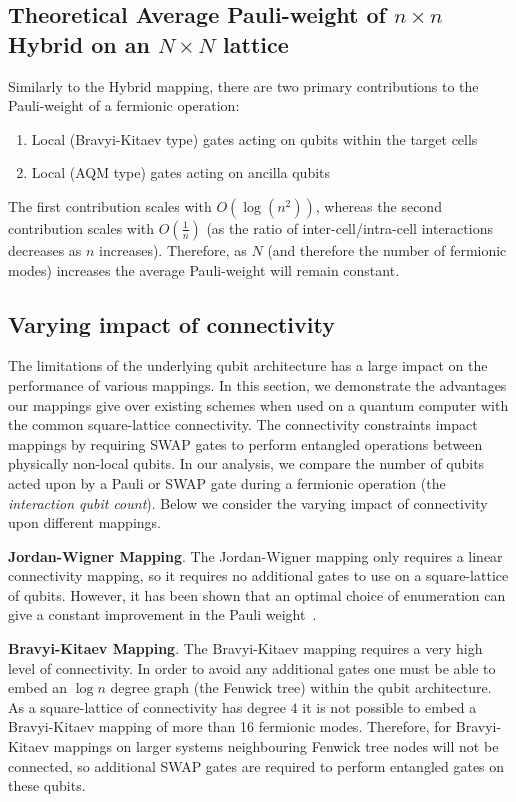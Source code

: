 \documentclass[pdftex,pra,aps,twocolumn,twoside]{revtex4-1}
\theoremstyle{plain}
\theoremstyle{note}
\newcommand\+{{\footnotesize \raisebox{0.3ex}{+}}}
\begin{document}
\subsection{Theoretical Average Pauli-weight of $n\times n$ Hybrid\+ on an $N\times N$ lattice}
Similarly to the Hybrid mapping, there are two primary contributions to the Pauli-weight of a fermionic operation:
\begin{enumerate}
    \item Local (Bravyi-Kitaev type) gates acting on qubits within the target cells
    \item Local (AQM type) gates acting on ancilla qubits
\end{enumerate}
The first contribution scales with $O(\log(n^2))$, whereas the second contribution scales with $O(\frac{1}{n})$ (as the ratio of inter-cell/intra-cell interactions decreases as $n$ increases). Therefore, as $N$ (and therefore the number of fermionic modes) increases the average Pauli-weight will remain constant.

\subsection{Varying impact of connectivity}
\label{section:connectivity}
The limitations of the underlying qubit architecture has a large impact on the performance of various mappings. In this section, we demonstrate the advantages our mappings give over existing schemes when used on a quantum computer with the common square-lattice connectivity. The connectivity constraints impact mappings by requiring SWAP gates to perform entangled operations between physically non-local qubits. In our analysis, we compare the number of qubits acted upon by a Pauli or SWAP gate during a fermionic operation (the \textit{interaction qubit count}). Below we consider the varying impact of connectivity upon different mappings.

\textbf {Jordan-Wigner Mapping}. The Jordan-Wigner mapping only requires a linear connectivity mapping, so it requires no additional gates to use on a square-lattice of qubits. However, it has been shown that an optimal choice of enumeration can give a constant improvement in the Pauli weight~\cite{chiew2021optimal}.

\textbf {Bravyi-Kitaev Mapping}.
The Bravyi-Kitaev mapping requires a very high level of connectivity. In order to avoid any additional gates one must be able to embed an $\log n$ degree graph (the Fenwick tree) within the qubit architecture. As a square-lattice of connectivity has degree $4$ it is not possible to embed a Bravyi-Kitaev mapping of more than 16 fermionic modes. Therefore, for Bravyi-Kitaev mappings on larger systems neighbouring Fenwick tree nodes will not be connected, so additional SWAP gates are required to perform entangled gates on these qubits.
\end{document}
